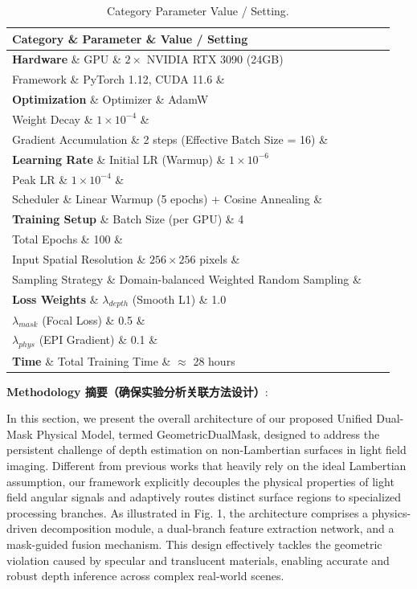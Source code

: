 \documentclass[lettersize,journal]{IEEEtran}
\begin{document}
\begin{table}[!t]
\caption{Category Parameter Value / Setting.}
\label{tab:table2}
\centering
\begin{tabular}{lll}
\toprule
Category \& Parameter \& Value / Setting \\
\midrule
\textbf{Hardware} \& GPU \& $2 \times$ NVIDIA RTX 3090 (24GB) \\
Framework \& PyTorch 1.12, CUDA 11.6 \& \\
\textbf{Optimization} \& Optimizer \& AdamW \\
Weight Decay \& $1 \times 10^{-4}$ \& \\
Gradient Accumulation \& 2 steps (Effective Batch Size = 16) \& \\
\textbf{Learning Rate} \& Initial LR (Warmup) \& $1 \times 10^{-6}$ \\
Peak LR \& $1 \times 10^{-4}$ \& \\
Scheduler \& Linear Warmup (5 epochs) + Cosine Annealing \& \\
\textbf{Training Setup} \& Batch Size (per GPU) \& 4 \\
Total Epochs \& 100 \& \\
Input Spatial Resolution \& $256 \times 256$ pixels \& \\
Sampling Strategy \& Domain-balanced Weighted Random Sampling \& \\
\textbf{Loss Weights} \& $\lambda_{depth}$ (Smooth L1) \& 1.0 \\
$\lambda_{mask}$ (Focal Loss) \& 0.5 \& \\
$\lambda_{phys}$ (EPI Gradient) \& 0.1 \& \\
\textbf{Time} \& Total Training Time \& $\approx$ 28 hours \\
\bottomrule
\end{tabular}
\end{table}
\textbf{Methodology 摘要（确保实验分析关联方法设计）}:


In this section, we present the overall architecture of our proposed Unified Dual-Mask Physical Model, termed GeometricDualMask, designed to address the persistent challenge of depth estimation on non-Lambertian surfaces in light field imaging. Different from previous works that heavily rely on the ideal Lambertian assumption, our framework explicitly decouples the physical properties of light field angular signals and adaptively routes distinct surface regions to specialized processing branches. As illustrated in Fig. 1, the architecture comprises a physics-driven decomposition module, a dual-branch feature extraction network, and a mask-guided fusion mechanism. This design effectively tackles the geometric violation caused by specular and translucent materials, enabling accurate and robust depth inference across complex real-world scenes.
\end{document}

